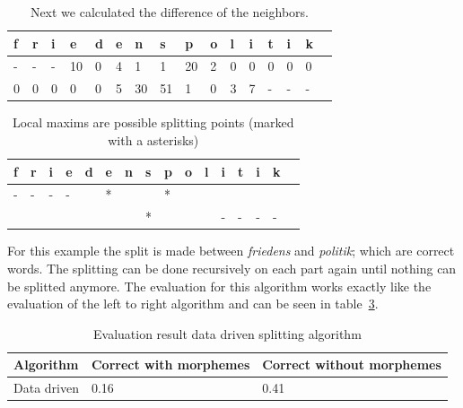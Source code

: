 \documentclass[11pt, accentcolor=tud9b, nochapname]{tudreport}
\begin{document}
\begin{table}[h]
\begin{center}
  \begin{tabular}{|l|l|l|l|l|l|l|l|l|l|l|l|l|l|l|l|}
    \hline
    f&r&i&e&d&e&n&s&p&o&l&i&t&i&k \\ \hline
    -&-&-&10&0&4&1&1&20&2&0&0&0&0&0 \\ \hline
    0&0&0&0&0&5&30&51&1&0&3&7&-&-&- \\ \hline
  \end{tabular}
  \caption{Next we calculated the difference of the neighbors.}
  \label{ex_dd_2}
\end{center}
\end{table}

\begin{table}[h]
\begin{center}
  \begin{tabular}{|l|l|l|l|l|l|l|l|l|l|l|l|l|l|l|l|}
    \hline
    f&r&i&e&d&e&n&s&p&o&l&i&t&i&k \\ \hline
    -&-&-&-& &*& & &*& & & & & &  \\ \hline
     & & & & & & &*& & & &-&-&-&- \\ \hline
  \end{tabular}
  \caption{Local maxims are possible splitting points (marked with a asterisks)}
  \label{ex_dd_3}
\end{center}
\end{table}

For this example the split is made between \emph{friedens} and \emph{politik}; which are correct words. The splitting can be done recursively on each part again until nothing can be splitted anymore. The evaluation for this algorithm works exactly like the evaluation of the left to right algorithm and can be seen in table~\ref{tab_eval_dd}.

\begin{table}[h]
  \begin{center}
    \begin{tabular}{l | l | l}
      \hline
      \textbf{Algorithm}  & \textbf{Correct with morphemes} & \textbf{Correct without morphemes} \\ \hline
      Data driven & 0.16 & 0.41 \\ \hline
    \end{tabular}
  \end{center}
  \caption{Evaluation result data driven splitting algorithm}
  \label{tab_eval_dd}
\end{table}
\end{document}
